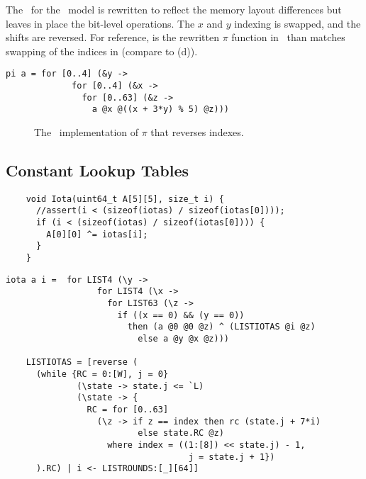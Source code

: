 The \cryptol\ for the \fips\ model is rewritten to reflect the memory layout differences but leaves in place the bit-level operations.
The $x$ and $y$ indexing is swapped, and the shifts are reversed.
For reference,  is the rewritten $\pi$ function in \cryptol\ than matches swapping of the indices in \openssl (compare to (d)).

\newsavebox{\PiOpenSSL}
\begin{lrbox}{\PiOpenSSL}
  \begin{lstlisting}[language=Cryptol]
    pi a = for [0..4] (&y ->
             for [0..4] (&x -> 
               for [0..63] (&z -> 
                 a @x @((x + 3*y) % 5) @z)))  
  \end{lstlisting}
\end{lrbox}

\begin{figure}[t]
  \begin{center}
    \usebox{\PiOpenSSL}
  \end{center}
  \caption{The \openssl\ implementation of $\pi$ that reverses indexes.}
  \label{fig:piopenssl}
\end{figure}

\subsection{Constant Lookup Tables}

\newsavebox{\ciota}
\begin{lrbox}{\ciota}
  \begin{lstlisting}
    void Iota(uint64_t A[5][5], size_t i) {
      //assert(i < (sizeof(iotas) / sizeof(iotas[0])));
      if (i < (sizeof(iotas) / sizeof(iotas[0]))) {
        A[0][0] ^= iotas[i];
      }
    }
  \end{lstlisting}    
\end{lrbox}


\newsavebox{\cryciota}
\begin{lrbox}{\cryciota}
  \begin{lstlisting}[language=Cryptol]
    iota a i =  for LIST4 (\y ->
                  for LIST4 (\x ->
                    for LIST63 (\z ->
                      if ((x == 0) && (y == 0))
                        then (a @0 @0 @z) ^ (LISTIOTAS @i @z)
	                      else a @y @x @z)))

    LISTIOTAS = [reverse (
      (while {RC = 0:[W], j = 0} 
              (\state -> state.j <= `L) 
              (\state -> { 
                RC = for [0..63] 
                  (\z -> if z == index then rc (state.j + 7*i)
                          else state.RC @z)
                    where index = ((1:[8]) << state.j) - 1,
                                    j = state.j + 1})
      ).RC) | i <- LISTROUNDS:[_][64]]
  \end{lstlisting}    
\end{lrbox}

